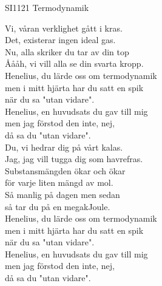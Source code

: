 \documentclass[a6paper, 10pt, twoside]{article}
\begin{document}
\noindent
\begin{center}
\footnotesize SI1121 Termodynamik\\
\end{center}
\begin{lyrics}
Vi, våran verklighet gått i kras. \\
Det, existerar ingen ideal gas. \\
Nu, alla skriker du tar av din top \\
Åååh, vi vill alla se din svarta kropp.
\vspace{5pt} \\
Henelius, du lärde oss om termodynamik \\
men i mitt hjärta har du satt en spik \\
när du sa "utan vidare".
\vspace{5pt} \\
Henelius, en huvudsats du gav till mig \\
men jag förstod den inte, nej, \\
då sa du "utan vidare".
\vspace{5pt} \\
Du, vi hedrar dig på vårt kalas. \\
Jag, jag vill tugga dig som havrefras. \\
Substansmängden ökar och ökar \\
för varje liten mängd av mol.  \\
Så manlig på dagen men sedan \\
så tar du på en megakJoule.
\vspace{5pt} \\
Henelius, du lärde oss om termodynamik \\
men i mitt hjärta har du satt en spik \\
när du sa "utan vidare".
\vspace{5pt} \\
Henelius, en huvudsats du gav till mig \\
men jag förstod den inte, nej, \\
då sa du "utan vidare".
\end{lyrics}
\end{document}
